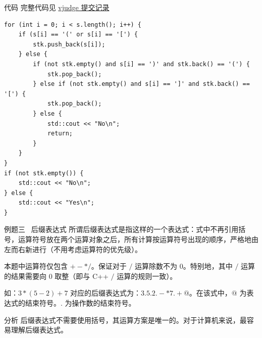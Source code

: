 \documentclass{beamer}
\begin{document}
\begin{frame}[fragile]{代码}
    完整代码见 \href{https://vjudge.net/solution/64150195/NWv7brPjI5uhjS91FLfu}{vjudge 提交记录}

    \begin{verbatim}
for (int i = 0; i < s.length(); i++) {
    if (s[i] == '(' or s[i] == '[') {
        stk.push_back(s[i]);
    } else {
        if (not stk.empty() and s[i] == ')' and stk.back() == '(') {
            stk.pop_back();
        } else if (not stk.empty() and s[i] == ']' and stk.back() == '[') {
            stk.pop_back();
        } else {
            std::cout << "No\n";
            return;
        }
    }
}
if (not stk.empty()) {
    std::cout << "No\n";
} else {
    std::cout << "Yes\n";
}
    \end{verbatim}
\end{frame}

\begin{frame}{例题三 \ 后缀表达式}
所谓后缀表达式是指这样的一个表达式：式中不再引用括号，运算符号放在两个运算对象之后，所有计算按运算符号出现的顺序，严格地由左而右新进行（不用考虑运算符的优先级）。

本题中运算符仅包含 $+ - * /$。保证对于 $/$ 运算除数不为 $0$。特别地，其中 $/$ 运算的结果需要向 $0$ 取整（即与 C++ $/$ 运算的规则一致）。

如：$3*(5-2)+7$ 对应的后缀表达式为：$3.5.2.-*7.+@$。在该式中，$@$ 为表达式的结束符号。$.$ 为操作数的结束符号。
\end{frame}

\begin{frame}{分析}
    后缀表达式不需要使用括号，其运算方案是唯一的。对于计算机来说，最容易理解后缀表达式。\\

\end{frame}
\end{document}
